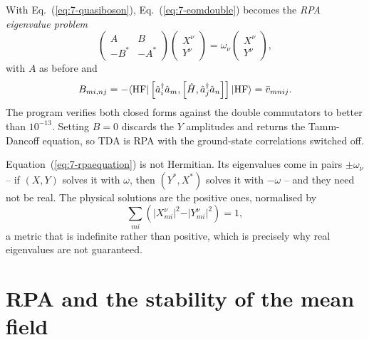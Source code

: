 With Eq.~(\ref{eq:7-quasiboson}), Eq.~(\ref{eq:7-eomdouble}) becomes the
\emph{RPA eigenvalue problem}
\begin{equation}
  \boxed{\;
  \begin{pmatrix} A & B\\ -B^{*} & -A^{*}\end{pmatrix}
  \begin{pmatrix} X^{\nu}\\ Y^{\nu}\end{pmatrix}
   = \omega_{\nu}
  \begin{pmatrix} X^{\nu}\\ Y^{\nu}\end{pmatrix} ,
  \;}
  \label{eq:7-rpaequation}
\end{equation}
with $A$ as before and
\begin{equation}
  B_{mi,nj}
   = -\langle \mathrm{HF} | \left[\hat{a}^{\dagger}_{i}\hat{a}_{m},
       \left[\hat{H},\hat{a}^{\dagger}_{j}\hat{a}_{n}\right]\right] | \mathrm{HF} \rangle
   = \bar{v}_{mnij}.
  \label{eq:7-Bmatrix}
\end{equation}
The program verifies both closed forms against the double commutators to
better than $10^{-13}$.  Setting $B=0$ discards the $Y$ amplitudes and returns
the Tamm-Dancoff equation, so TDA is RPA with the ground-state correlations
switched off.

Equation~(\ref{eq:7-rpaequation}) is not Hermitian.  Its eigenvalues come in
pairs $\pm\omega_{\nu}$ -- if $(X,Y)$ solves it with $\omega$, then
$(Y^{*},X^{*})$ solves it with $-\omega$ -- and they need not be real.  The
physical solutions are the positive ones, normalised by
\begin{equation}
  \sum_{mi}\left(\vert X^{\nu}_{mi}\vert^2
    - \vert Y^{\nu}_{mi}\vert^2\right) = 1,
  \label{eq:7-rpanorm}
\end{equation}
a metric that is indefinite rather than positive, which is precisely why real
eigenvalues are not guaranteed.

\section{RPA and the stability of the mean field}
\label{sec:rpastability}

